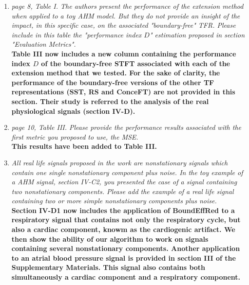 \documentclass[11pt,DIV=16]{scrartcl}
\begin{document}
\begin{enumerate}[1)]
{dozen oscillations is generally appropriate.}
\item
\textit{page 8, Table I. The authors present the performance of the extension method when applied to a toy AHM model. But they do not provide an insight of the impact, in this specific case, on the associated "boundary-free" TFR. Please include in this table the "performance index $D$" estimation proposed in section "Evaluation Metrics".}\\
\textbf{Table III now includes a new column containing the performance index $D$ of the boundary-free STFT associated with each of the extension method that we tested. For the sake of clarity, the performance of the boundary-free versions of the other TF representations (SST, RS and ConceFT) are not provided in this section. Their study is referred to the analysis of the real physiological signals (section IV-D).}
\item
\textit{page 10, Table III. Please provide the performance results associated with the first metric you proposed to use, the MSE. }\\
\textbf{This results have been added to Table III.}
\item
\textit{All real life signals proposed in the work are nonstationary signals which contain one single nonstationary component plus noise. In the toy example of a  AHM signal, section IV-C2, you presented the case of a signal containing two nonstationary components. Please add the example of a real life signal containing two or more simple nonstationary components plus noise.}\\
\textbf{Section IV-D1 now includes the application of \textsf{BoundEffRed} to a respiratory signal that contains not only the respiratory cycle, but also a
cardiac component, knowm as the cardiogenic artifact. We then show the ability of our algorithm to work on
signals containing several nonstationary components. Another application to an atrial blood pressure signal is provided in section III of the Supplementary Materials. This signal also contains both simultaneously a cardiac component and a respiratory component.}
\end{enumerate}
\end{document}
